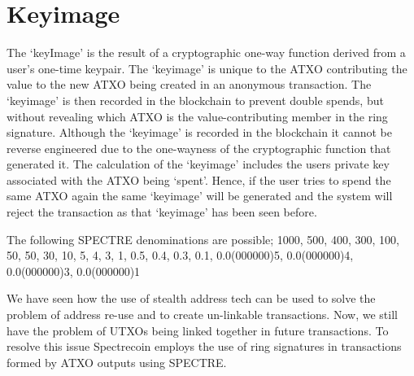 \section{Keyimage}
The ‘keyImage’ is the result of a cryptographic one-way function derived
from a user’s one-time keypair. The ‘keyimage’ is unique to the ATXO
contributing the value to the new ATXO being created in an anonymous
transaction. The ‘keyimage’ is then recorded in the blockchain to prevent
double spends, but without revealing which ATXO is the value-contributing
member in the ring signature. Although the ‘keyimage’ is recorded in the
blockchain it cannot be reverse engineered due to the one-wayness of the
cryptographic function that generated it. The calculation of the ‘keyimage’
includes the users private key associated with the ATXO being ‘spent’.
Hence, if the user tries to spend the same ATXO again the same ‘keyimage’
will be generated and the system will reject the transaction as that
‘keyimage’ has been seen before.



The following SPECTRE denominations are possible; 1000, 500, 400, 300, 100,
50, 50, 30, 10, 5, 4, 3, 1, 0.5, 0.4, 0.3, 0.1, 0.0(000000)5, 0.0(000000)4,
0.0(000000)3, 0.0(000000)1



We have seen how the use of stealth address tech can be used to solve the
problem of address re-use and to create un-linkable transactions. Now, we
still have the problem of UTXOs being linked together in future transactions.
To resolve this issue Spectrecoin employs the use of ring signatures in
transactions formed by ATXO outputs using SPECTRE.
